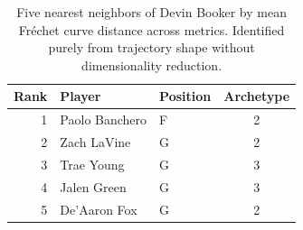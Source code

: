 \begin{table}[htbp]
  \centering\small
  \begin{tabular}{rllc}
    \toprule
    Rank & Player & Position & Archetype \\
    \midrule
    1 & Paolo Banchero & F & 2 \\
    2 & Zach LaVine & G & 2 \\
    3 & Trae Young & G & 3 \\
    4 & Jalen Green & G & 3 \\
    5 & De'Aaron Fox & G & 2 \\
    \bottomrule
  \end{tabular}
  \caption{Five nearest neighbors of Devin Booker by mean Fr\'{e}chet curve distance across metrics. Identified purely from trajectory shape without dimensionality reduction.}
  \label{tab:Devin_Booker_frechet_curve_neighbors}
\end{table}

